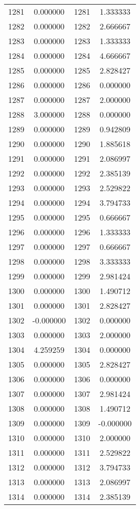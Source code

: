 \documentclass[12pt]{article}
\begin{document}
\begin{longtable}{@{}cccc@{}}
1281 & 0.000000 & 1281 & 1.333333 \\
1282 & 0.000000 & 1282 & 2.666667 \\
1283 & 0.000000 & 1283 & 1.333333 \\
1284 & 0.000000 & 1284 & 4.666667 \\
1285 & 0.000000 & 1285 & 2.828427 \\
1286 & 0.000000 & 1286 & 0.000000 \\
1287 & 0.000000 & 1287 & 2.000000 \\
1288 & 3.000000 & 1288 & 0.000000 \\
1289 & 0.000000 & 1289 & 0.942809 \\
1290 & 0.000000 & 1290 & 1.885618 \\
1291 & 0.000000 & 1291 & 2.086997 \\
1292 & 0.000000 & 1292 & 2.385139 \\
1293 & 0.000000 & 1293 & 2.529822 \\
1294 & 0.000000 & 1294 & 3.794733 \\
1295 & 0.000000 & 1295 & 0.666667 \\
1296 & 0.000000 & 1296 & 1.333333 \\
1297 & 0.000000 & 1297 & 0.666667 \\
1298 & 0.000000 & 1298 & 3.333333 \\
1299 & 0.000000 & 1299 & 2.981424 \\
1300 & 0.000000 & 1300 & 1.490712 \\
1301 & 0.000000 & 1301 & 2.828427 \\
1302 & -0.000000 & 1302 & 0.000000 \\
1303 & 0.000000 & 1303 & 2.000000 \\
1304 & 4.259259 & 1304 & 0.000000 \\
1305 & 0.000000 & 1305 & 2.828427 \\
1306 & 0.000000 & 1306 & 0.000000 \\
1307 & 0.000000 & 1307 & 2.981424 \\
1308 & 0.000000 & 1308 & 1.490712 \\
1309 & 0.000000 & 1309 & -0.000000 \\
1310 & 0.000000 & 1310 & 2.000000 \\
1311 & 0.000000 & 1311 & 2.529822 \\
1312 & 0.000000 & 1312 & 3.794733 \\
1313 & 0.000000 & 1313 & 2.086997 \\
1314 & 0.000000 & 1314 & 2.385139 \\

\end{longtable}
\end{document}
